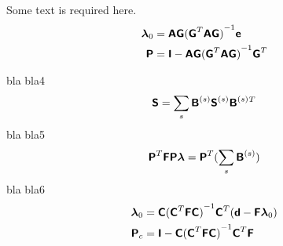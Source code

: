 


Some text is required here.
\begin{align}
\lagvec_0 &= \scalemat\rmodespace\inv{(\tp{\rmodespace}\scalemat\rmodespace)}\dvec{e} \\
\projn&=\eyemat - \scalemat\rmodespace\inv{(\tp{\rmodespace}\scalemat\rmodespace)}\tp{\rmodespace}
\end{align}

bla bla4
\begin{align}
\scaled{\locschur}=\sum_s \ids{{\scaled{\asmop}}} \ids{{\scaled{\locschur}}}
{\ids{{\scaled{\asmop}}}}{}^T  \\
\end{align}
bla bla5
\begin{align}
\tp{\projn}\locdualschur\projn\scaled{\lagvec}=\tp{\projn} (\sum_s \ids{\asmop}  )
\end{align}
bla bla6
\begin{align}
\scaled{\lagvec}_0&=\cspace\inv{(\tp{\cspace}\locdualschur\cspace)}\tp{\cspace} (\ifacedispvec-\locdualschur\lagvec_0)\\
\projc&=\eyemat-\cspace\inv{(\tp{\cspace}\locdualschur\cspace)}\tp{\cspace} \locdualschur
\end{align}


